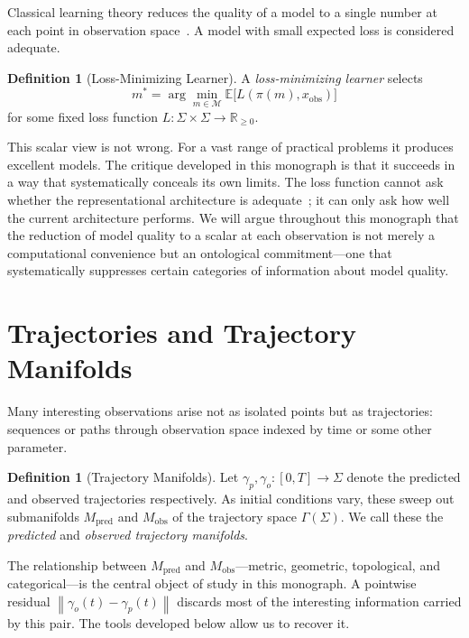 \documentclass[12pt,oneside]{book}
\theoremstyle{plain}
\theoremstyle{definition}
\newtheorem{definition}[theorem]{Definition}
\theoremstyle{remark}
\newcommand{\M}{\mathcal{M}}
\newcommand{\norm}[1]{\left\lVert #1 \right\rVert}
\newcommand{\1}{\mathbf{1}}
\begin{document}
Classical learning theory reduces the quality of a model to a single number at each point in observation space~\cite{vapnik1998,cover2006,shalev2014}. A model with small expected loss is considered adequate.

\begin{definition}[Loss-Minimizing Learner]
A \emph{loss-minimizing learner} selects
\[
m^* = \arg\min_{m \in \M} \mathbb{E}\bigl[L(\pi(m), x_{\mathrm{obs}})\bigr]
\]
for some fixed loss function $L : \Sigma \times \Sigma \to \mathbb{R}_{\geq 0}$.
\end{definition}

This scalar view is not wrong. For a vast range of practical problems it produces excellent models. The critique developed in this monograph is that it succeeds in a way that systematically conceals its own limits. The loss function cannot ask whether the representational architecture is adequate~\cite{wimsatt2007,simon1969}; it can only ask how well the current architecture performs. We will argue throughout this monograph that the reduction of model quality to a scalar at each observation is not merely a computational convenience but an ontological commitment---one that systematically suppresses certain categories of information about model quality.

\section{Trajectories and Trajectory Manifolds}

Many interesting observations arise not as isolated points but as trajectories: sequences or paths through observation space indexed by time or some other parameter.

\begin{definition}[Trajectory Manifolds]
Let $\gamma_p, \gamma_o : [0,T] \to \Sigma$ denote the predicted and observed trajectories respectively. As initial conditions vary, these sweep out submanifolds $M_{\mathrm{pred}}$ and $M_{\mathrm{obs}}$ of the trajectory space $\Gamma(\Sigma)$. We call these the \emph{predicted} and \emph{observed trajectory manifolds}.
\end{definition}

The relationship between $M_{\mathrm{pred}}$ and $M_{\mathrm{obs}}$---metric, geometric, topological, and categorical---is the central object of study in this monograph. A pointwise residual $\norm{\gamma_o(t) - \gamma_p(t)}$ discards most of the interesting information carried by this pair. The tools developed below allow us to recover it.
\end{document}
